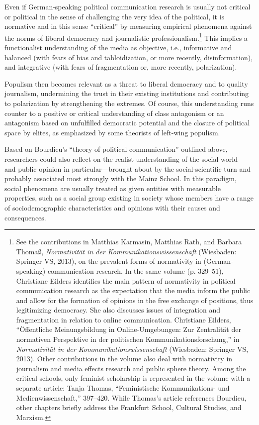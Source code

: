 \documentclass{tufte-handout}
\begin{document}
Even if German-speaking political communication research is usually not
critical or political in the sense of challenging the very idea of the
political, it is normative and in this sense ``critical'' by measuring
empirical phenomena against the norms of liberal democracy and
journalistic professionalism.\footnote{See the contributions in Matthias
  Karmasin, Matthias Rath, and Barbara Thomaß, \emph{Normativität in der
  Kommunikationswissenschaft} (Wiesbaden: Springer VS, 2013), on the
  prevalent forms of normativity in (German-speaking) communication
  research. In the same volume (p. 329--51), Christiane Eilders
  identifies the main pattern of normativity in political communication
  research as the expectation that the media inform the public and allow
  for the formation of opinions in the free exchange of positions, thus
  legitimizing democracy. She also discusses issues of integration and
  fragmentation in relation to online communication. Christiane Eilders,
  ``Öffentliche Meinungsbildung in Online-Umgebungen: Zur Zentralität
  der normativen Perspektive in der politischen
  Kommunikationsforschung,'' in \emph{Normativität in der
  Kommunikationswissenschaft} (Wiesbaden: Springer VS, 2013). Other
  contributions in the volume also deal with normativity in journalism
  and media effects research and public sphere theory. Among the
  critical schools, only feminist scholarship is represented in the
  volume with a separate article: Tanja Thomas, ``Feministische
  Kommunikations- und Medienwissenschaft,'' 397--420. While Thomas's
  article references Bourdieu, other chapters briefly address the
  Frankfurt School, Cultural Studies, and Marxism.} This implies a
functionalist understanding of the media as objective, i.e., informative
and balanced (with fears of bias and tabloidization, or more recently,
disinformation), and integrative (with fears of fragmentation or, more
recently, polarization).

Populism then becomes relevant as a threat to liberal democracy and to
quality journalism, undermining the trust in their existing institutions
and contributing to polarization by strengthening the extremes. Of
course, this understanding runs counter to a positive or critical
understanding of class antagonism or an antagonism based on unfulfilled
democratic potential and the closure of political space by elites, as
emphasized by some theorists of left-wing populism.

Based on Bourdieu's ``theory of political communication'' outlined
above, researchers could also reflect on the realist understanding of
the social world---and public opinion in particular---brought about by
the social-scientific turn and probably associated most strongly with
the Mainz School. In this paradigm, social phenomena are usually treated
as given entities with measurable properties, such as a social group
existing in society whose members have a range of sociodemographic
characteristics and opinions with their causes and consequences.
\end{document}
